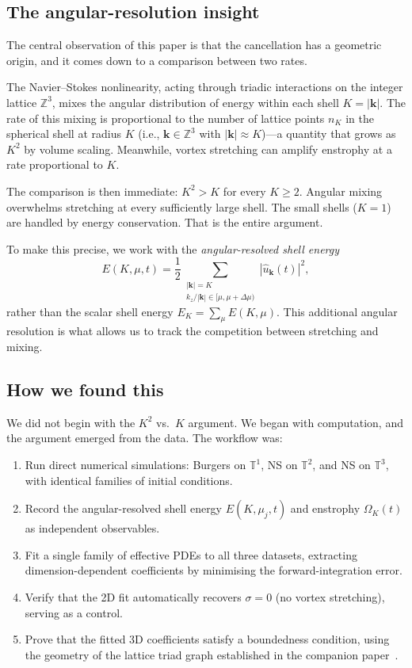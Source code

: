 \documentclass[11pt,a4paper]{article}
\theoremstyle{remark}
\newcommand{\Z}{\mathbb{Z}}
\newcommand{\T}{\mathbb{T}}
\begin{document}
\subsection{The angular-resolution insight}

The central observation of this paper is that the cancellation has a geometric origin, and it comes down to a comparison between two rates.

The Navier--Stokes nonlinearity, acting through triadic interactions on the integer lattice $\Z^3$, mixes the angular distribution of energy within each shell $K = |\mathbf{k}|$.  The rate of this mixing is proportional to the number of lattice points $n_K$ in the spherical shell at radius $K$ (i.e., $\mathbf{k} \in \Z^3$ with $|\mathbf{k}| \approx K$)---a quantity that grows as $K^2$ by volume scaling.  Meanwhile, vortex stretching can amplify enstrophy at a rate proportional to $K$.

The comparison is then immediate: $K^2 > K$ for every $K \geq 2$.  Angular mixing overwhelms stretching at every sufficiently large shell.  The small shells ($K = 1$) are handled by energy conservation.  That is the entire argument.

To make this precise, we work with the \emph{angular-resolved shell energy}
\[
  E(K, \mu, t) = \frac{1}{2} \sum_{\substack{|\mathbf{k}|=K \\ k_z/|\mathbf{k}| \in [\mu, \mu+\Delta\mu)}} |\hat{u}_{\mathbf{k}}(t)|^2,
\]
rather than the scalar shell energy $E_K = \sum_\mu E(K,\mu)$.  This additional angular resolution is what allows us to track the competition between stretching and mixing.

\subsection{How we found this}

We did not begin with the $K^2$ vs.\ $K$ argument.  We began with computation, and the argument emerged from the data.  The workflow was:
\begin{enumerate}
\item Run direct numerical simulations: Burgers on $\T^1$, NS on $\T^2$, and NS on $\T^3$, with identical families of initial conditions.
\item Record the angular-resolved shell energy $E(K, \mu_j, t)$ and enstrophy $\Omega_K(t)$ as independent observables.
\item Fit a single family of effective PDEs to all three datasets, extracting dimension-dependent coefficients by minimising the forward-integration error.
\item Verify that the 2D fit automatically recovers $\sigma = 0$ (no vortex stretching), serving as a control.
\item Prove that the fitted 3D coefficients satisfy a boundedness condition, using the geometry of the lattice triad graph established in the companion paper~\cite{higgins2026cascade}.
\end{enumerate}
\end{document}
